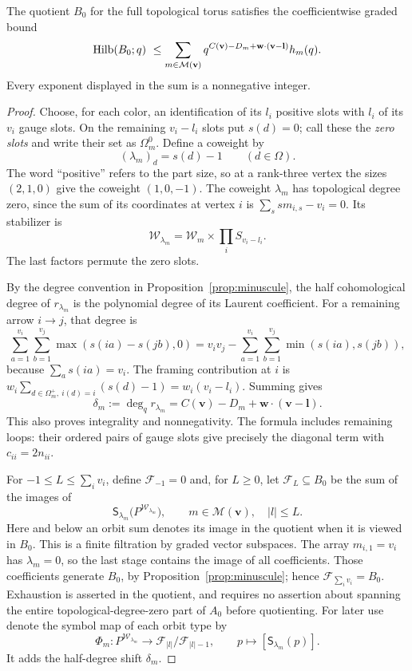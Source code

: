 \begin{proposition}\label{prop:filtration-bound}
The quotient $B_0$ for the full topological torus satisfies the
coefficientwise graded bound
\begin{equation}\label{eq:filtration-bound}
 \operatorname{Hilb}(B_0;q)\ \leq
 \sum_{m\in\mathcal M(\mathbf v)}
 q^{C(\mathbf v)-D_m+\mathbf w\cdot(\mathbf v-\mathbf l)}h_m(q).
\end{equation}
Every exponent displayed in the sum is a nonnegative integer.
\end{proposition}

\begin{proof}
Choose, for each color, an identification of its $l_i$ positive slots
with $l_i$ of its $v_i$ gauge slots.  On the remaining $v_i-l_i$ slots
put $s(d)=0$; call these the \emph{zero slots} and write their set as
$\Omega_m^0$.  Define a coweight by
\[
 (\lambda_m)_d=s(d)-1\qquad(d\in\Omega).
\]
The word ``positive'' refers to the part size, so at a rank-three vertex
the sizes $(2,1,0)$ give the coweight $(1,0,-1)$.
The coweight $\lambda_m$ has topological degree zero, since the sum of its coordinates at
vertex $i$ is $\sum_s s m_{i,s}-v_i=0$.  Its stabilizer is
\[
 \mathcal W_{\lambda_m}
 =\mathcal W_m\times\prod_i S_{v_i-l_i}.
\]
The last factors permute the zero slots.

By the degree convention in Proposition~\ref{prop:minuscule}, the
half cohomological degree of $r_{\lambda_m}$ is the polynomial degree
of its Laurent coefficient.  For a remaining arrow $i\to j$, that
degree is
\[
 \sum_{a=1}^{v_i}\sum_{b=1}^{v_j}
       \max(s(ia)-s(jb),0)
 =v_iv_j-\sum_{a=1}^{v_i}\sum_{b=1}^{v_j}
                         \min(s(ia),s(jb)),
\]
because $\sum_a s(ia)=v_i$.  The framing contribution at $i$ is
$w_i\sum_{d\in\Omega_m^+,\ i(d)=i}(s(d)-1)=w_i(v_i-l_i)$.
Summing gives
\begin{equation}\label{eq:multipartition-shift}
 \delta_m:=\deg_q r_{\lambda_m}
 =C(\mathbf v)-D_m+\mathbf w\cdot(\mathbf v-\mathbf l).
\end{equation}
This also proves integrality and nonnegativity.  The formula includes
remaining loops: their ordered pairs of gauge slots give precisely
the diagonal term with $c_{ii}=2n_{ii}$.

For $-1\leq L\leq\sum_i v_i$, define $\mathcal F_{-1}=0$ and, for
$L\geq0$, let $\mathcal F_L\subseteq B_0$ be the sum of the images of
\[
 \mathsf S_{\lambda_m}\bigl(P^{\mathcal W_{\lambda_m}}\bigr),
 \qquad m\in\mathcal M(\mathbf v),\quad |l|\leq L.
\]
Here and below an orbit sum denotes its image in the quotient when it
is viewed in $B_0$.  This is a finite filtration by graded vector
subspaces.  The array $m_{i,1}=v_i$ has $\lambda_m=0$, so the last
stage contains the image of all coefficients.  Those coefficients
generate $B_0$, by Proposition~\ref{prop:minuscule}; hence
$\mathcal F_{\sum_i v_i}=B_0$.  Exhaustion is asserted in the quotient,
and requires no assertion about spanning the entire topological-degree-zero
part of $A_0$ before quotienting.
For later use denote the symbol map of each orbit type by
\[
 \Phi_m:P^{\mathcal W_{\lambda_m}}
 \longrightarrow\mathcal F_{|l|}/\mathcal F_{|l|-1},\qquad
 p\longmapsto[\mathsf S_{\lambda_m}(p)].
\]
It adds the half-degree shift $\delta_m$.


\end{proof}
